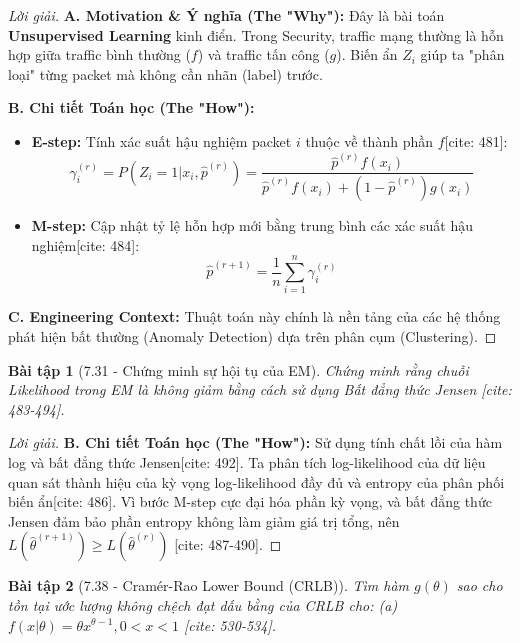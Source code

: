\documentclass[8pt,a4paper]{article}
\newtheorem{exercise}{Bài tập}
\newenvironment{solution}{\begin{proof}[Lời giải]}{\end{proof}}
\begin{document}
\begin{solution}
\textbf{A. Motivation \& Ý nghĩa (The "Why"):} Đây là bài toán \textbf{Unsupervised Learning} kinh điển. Trong Security, traffic mạng thường là hỗn hợp giữa traffic bình thường ($f$) và traffic tấn công ($g$). Biến ẩn $Z_i$ giúp ta "phân loại" từng packet mà không cần nhãn (label) trước.

\textbf{B. Chi tiết Toán học (The "How"):}
\begin{itemize}
    \item \textbf{E-step:} Tính xác suất hậu nghiệm packet $i$ thuộc về thành phần $f$[cite: 481]:
    \[ \gamma_i^{(r)} = P(Z_i=1 | x_i, \hat{p}^{(r)}) = \frac{\hat{p}^{(r)}f(x_i)}{\hat{p}^{(r)}f(x_i) + (1-\hat{p}^{(r)})g(x_i)} \]
    \item \textbf{M-step:} Cập nhật tỷ lệ hỗn hợp mới bằng trung bình các xác suất hậu nghiệm[cite: 484]:
    \[ \hat{p}^{(r+1)} = \frac{1}{n} \sum_{i=1}^n \gamma_i^{(r)} \]
\end{itemize}

\textbf{C. Engineering Context:} Thuật toán này chính là nền tảng của các hệ thống phát hiện bất thường (Anomaly Detection) dựa trên phân cụm (Clustering).
\end{solution}

\begin{exercise}[7.31 - Chứng minh sự hội tụ của EM]
Chứng minh rằng chuỗi Likelihood trong EM là không giảm bằng cách sử dụng Bất đẳng thức Jensen [cite: 483-494].
\end{exercise}

\begin{solution}
\textbf{B. Chi tiết Toán học (The "How"):}
Sử dụng tính chất lồi của hàm log và bất đẳng thức Jensen[cite: 492]. Ta phân tích log-likelihood của dữ liệu quan sát thành hiệu của kỳ vọng log-likelihood đầy đủ và entropy của phân phối biến ẩn[cite: 486]. Vì bước M-step cực đại hóa phần kỳ vọng, và bất đẳng thức Jensen đảm bảo phần entropy không làm giảm giá trị tổng, nên $L(\hat{\theta}^{(r+1)}) \ge L(\hat{\theta}^{(r)})$ [cite: 487-490].
\end{solution}

\begin{exercise}[7.38 - Cramér-Rao Lower Bound (CRLB)]
Tìm hàm $g(\theta)$ sao cho tồn tại ước lượng không chệch đạt dấu bằng của CRLB cho:
(a) $f(x|\theta) = \theta x^{\theta-1}, 0 < x < 1$ [cite: 530-534].
\end{exercise}
\end{document}
